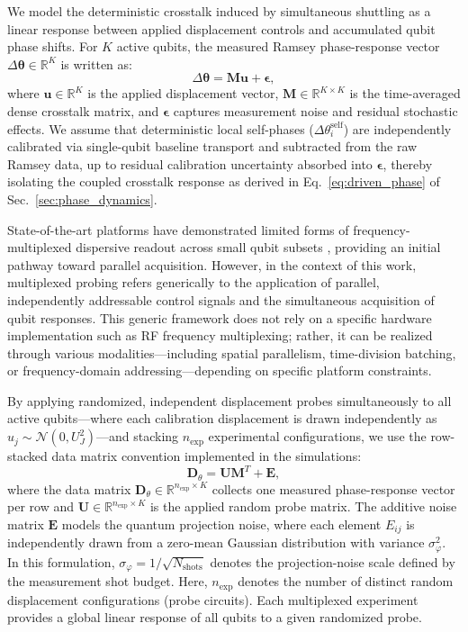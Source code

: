 \documentclass[a4paper,twocolumn,11pt]{quantumarticle}
\begin{document}
We model the deterministic crosstalk induced by simultaneous shuttling as a linear response between applied displacement controls and accumulated qubit phase shifts. For $K$ active qubits, the measured Ramsey phase-response vector $\Delta\boldsymbol\theta \in \mathbb{R}^K$ is written as:
\begin{equation}
    \Delta\boldsymbol\theta = \mathbf{M} \mathbf{u} + \boldsymbol{\epsilon},
\end{equation}
where $\mathbf{u} \in \mathbb{R}^K$ is the applied displacement vector, $\mathbf{M} \in \mathbb{R}^{K \times K}$ is the time-averaged dense crosstalk matrix, and $\boldsymbol{\epsilon}$ captures measurement noise and residual stochastic effects. We assume that deterministic local self-phases ($\Delta\theta_i^{\text{self}}$) are independently calibrated via single-qubit baseline transport and subtracted from the raw Ramsey data, up to residual calibration uncertainty absorbed into $\boldsymbol{\epsilon}$, thereby isolating the coupled crosstalk response as derived in Eq.~\eqref{eq:driven_phase} of Sec.~\ref{sec:phase_dynamics}.

State-of-the-art platforms have demonstrated limited forms of frequency-multiplexed dispersive readout across small qubit subsets \cite{philips_universal_2022, ruffino_cryo-cmos_2022}, providing an initial pathway toward parallel acquisition. However, in the context of this work, multiplexed probing refers generically to the application of parallel, independently addressable control signals and the simultaneous acquisition of qubit responses. This generic framework does not rely on a specific hardware implementation such as RF frequency multiplexing; rather, it can be realized through various modalities—including spatial parallelism, time-division batching, or frequency-domain addressing—depending on specific platform constraints. 

By applying randomized, independent displacement probes simultaneously to all active qubits---where each calibration displacement is drawn independently as $u_j \sim \mathcal{N}(0,U_J^2)$---and stacking $n_{\text{exp}}$ experimental configurations, we use the row-stacked data matrix convention implemented in the simulations:
\begin{equation}
    \mathbf{D}_{\theta} = \mathbf{U}\mathbf{M}^{T} + \mathbf{E},
\end{equation}
where the data matrix $\mathbf{D}_{\theta} \in \mathbb{R}^{n_{\text{exp}} \times K}$ collects one measured phase-response vector per row and $\mathbf{U} \in \mathbb{R}^{n_{\text{exp}} \times K}$ is the applied random probe matrix. The additive noise matrix $\mathbf{E}$ models the quantum projection noise, where each element $E_{ij}$ is independently drawn from a zero-mean Gaussian distribution with variance $\sigma_\varphi^2$. In this formulation, $\sigma_\varphi = 1/\sqrt{N_{\text{shots}}}$ denotes the projection-noise scale defined by the measurement shot budget.
Here, $n_{\text{exp}}$ denotes the number of distinct random displacement configurations (probe circuits). Each multiplexed experiment provides a global linear response of all qubits to a given randomized probe. 
\end{document}
